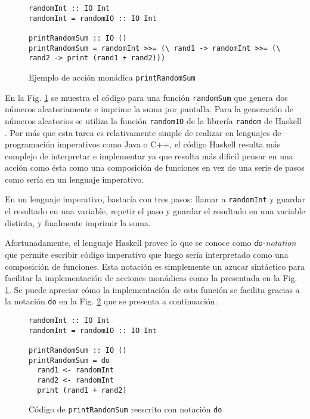 \begin{figure}[H]
  \centering
\begin{verbatim}
randomInt :: IO Int
randomInt = randomIO :: IO Int

printRandomSum :: IO ()
printRandomSum = randomInt >>= (\ rand1 -> randomInt >>= (\ rand2 -> print (rand1 + rand2)))
\end{verbatim}
  \caption{Ejemplo de acción monádica \texttt{printRandomSum}}
  \label{fig:functional-randomSum}
\end{figure}

En la Fig. \ref{fig:functional-randomSum} se muestra el código para una función \texttt{randomSum} que genera dos números aleatoriamente e imprime la suma por pantalla. Para la generación de números aleatorios se utiliza la función \texttt{randomIO} de la librería \texttt{random} de Haskell \cite{random}. Por más que esta tarea es relativamente simple de realizar en lenguajes de programación imperativos como Java o C++, el código Haskell resulta más complejo de interpretar e implementar ya que resulta más dificil pensar en una acción como ésta como una composición de funciones en vez de una serie de pasos como sería en un lenguaje imperativo.

En un lenguaje imperativo, bastaría con tres pasos: llamar a \texttt{randomInt} y guardar el resultado en una variable, repetir el paso y guardar el resultado en una variable distinta, y finalmente imprimir la suma.

Afortunadamente, el lenguaje Haskell provee lo que se conoce como \emph{\texttt{do}-notation} que permite escribir código imperativo que luego sería interpretado como una composición de funciones. Esta notación es simplemente un azucar sintáctico para facilitar la implementación de acciones monádicas como la presentada en la Fig. \ref{fig:functional-randomSum}. Se puede apreciar cómo la implementación de esta función se facilita gracias a la notación \texttt{do} en la Fig. \ref{fig:do-randomSum} que se presenta a continuación.

\begin{figure}[H]
  \centering
\begin{verbatim}
randomInt :: IO Int
randomInt = randomIO :: IO Int

printRandomSum :: IO ()
printRandomSum = do
  rand1 <- randomInt
  rand2 <- randomInt
  print (rand1 + rand2)
\end{verbatim}
  \caption{Código de \texttt{printRandomSum} reescrito con notación \texttt{do}}
  \label{fig:do-randomSum}
\end{figure}

